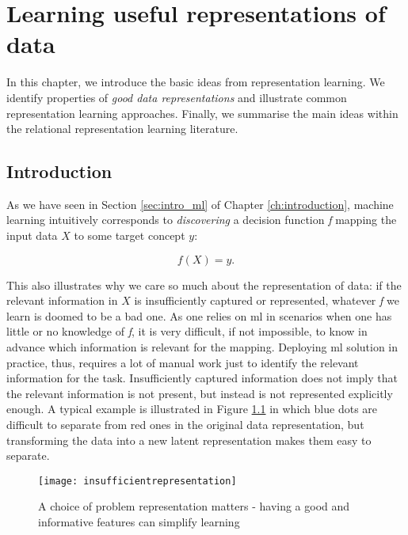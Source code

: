 \chapter{Learning useful representations of data}\label{ch:learningrepresentations}



In this chapter, we introduce the basic ideas from representation learning.
We identify properties of \textit{good data representations} and illustrate common representation learning approaches.
Finally, we summarise the main ideas within the relational representation learning literature.



\section{Introduction}


As we have seen in Section \ref{sec:intro_ml} of Chapter \ref{ch:introduction}, machine learning intuitively corresponds to \textit{discovering} a decision function \textit{f} mapping the input data $X$ to some target concept $y$:

\begin{equation}
	f(X) = y.
	\label{eq:ml}
\end{equation}


This also illustrates why we care so much about the representation of data: if the relevant information in $X$ is insufficiently captured or represented, whatever \textit{f} we learn  is doomed to be a bad one.
As one relies on \gls{ml} in scenarios when one has little or no knowledge of \textit{f}, it is very difficult, if not impossible, to know in advance which information is relevant for the mapping.
Deploying \gls{ml} solution in practice, thus, requires a lot of manual work just to identify the relevant information for the task.
Insufficiently captured information does not imply that the relevant information is not present, but instead is not represented explicitly enough.
A typical example is illustrated in Figure \ref{fig:transform} in which blue dots are difficult to separate from red ones in the original data representation, but transforming the data into a new latent representation makes them easy to separate.


\begin{figure}
	\centering
	\texttt{[image: insufficientrepresentation]}
	\caption[A choice of problem representation matters]{A choice of problem representation matters - having a good and informative features can simplify learning\label{fig:transform}}
\end{figure}

